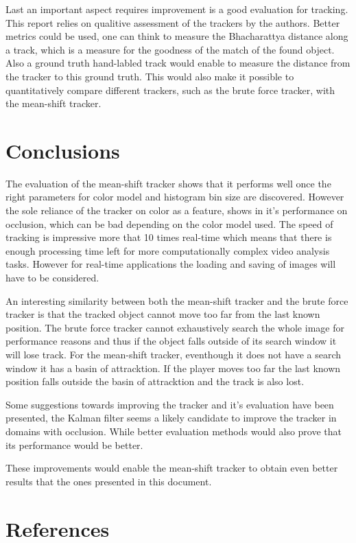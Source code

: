 \documentclass[a4paper,11pt]{article}
\begin{document}
Last an important aspect requires improvement is a good evaluation for tracking. This report relies on qualitive assessment of the trackers by the authors. Better metrics could be used, one can think to measure the Bhacharattya distance along a track, which is a measure for the goodness of the match of the found object. Also a ground truth hand-labled track would enable to measure the distance from the tracker to this ground truth. This would also make it possible to quantitatively compare different trackers, such as the brute force tracker, with the mean-shift tracker.


\section{Conclusions} \label{sec:conc}
The evaluation of the mean-shift tracker shows that it performs well once the right parameters for color model and histogram bin size are discovered. However the sole reliance of the tracker on color as a feature, shows in it's performance on occlusion, which can be bad depending on the color model used. The speed of tracking is impressive more that 10 times real-time which means that there is enough processing time left for more computationally complex video analysis tasks. However for real-time applications the loading and saving of images will have to be considered. 

An interesting similarity between both the mean-shift tracker and the brute force tracker is that the tracked object cannot move too far from the last known position. The brute force tracker cannot exhaustively search the whole image for performance reasons and thus if the object falls outside of its search window it will lose track. For the mean-shift tracker, eventhough it does not have a search window it has a basin of attracktion. If the player moves too far the last known position falls outside the basin of attracktion and the track is also lost.

Some suggestions towards improving the tracker and it's evaluation have been presented, the Kalman filter seems a likely candidate to improve the tracker in domains with occlusion. While better evaluation methods would also prove that its performance would be better.
 
These improvements would enable the mean-shift tracker to obtain even better results that the ones presented in this document. 
\section{References} 


\renewcommand\bibname{References}


\end{document}
